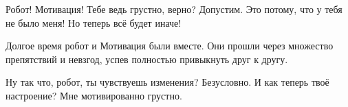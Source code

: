 \begin{dialog}
\X Робот!
\R Мотивация!
\X Тебе ведь грустно, верно?
\R Допустим.
\X Это потому, что у тебя не было меня! Но теперь всё будет иначе!
\end{dialog}

\begin{monolog}
Долгое время робот и Мотивация были вместе. Они прошли через множество препятствий и невзгод, успев полностью привыкнуть друг к другу.
\end{monolog}

\begin{dialog}
\X Ну так что, робот, ты чувствуешь изменения?
\R Безусловно.
\X И как теперь твоё настроение?
\R Мне мотивированно грустно.
\end{dialog}